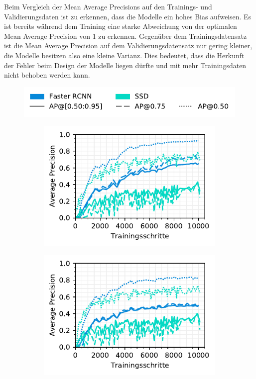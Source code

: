 Beim Vergleich der Mean Average Precisions auf den Trainings- und Validierungsdaten ist zu erkennen, dass die Modelle ein hohes Bias aufweisen. Es ist bereits während dem Training eine starke Abweichung von der optimalen Mean Average Precision von 1 zu erkennen. Gegenüber dem Trainingsdatensatz ist die Mean Average Precision auf dem Validierungsdatensatz nur gering kleiner, die Modelle besitzen also eine kleine Varianz. Dies bedeutet, dass die Herkunft der Fehler beim Design der Modelle liegen dürfte und mit mehr Trainingsdaten nicht behoben werden kann. 

\begin{figure}[H]
  \captionsetup{width=.9\linewidth}
  \caption{TODO}
  \label{fig:3ap-map}
  \centering
  \includegraphics[scale=1]{graphics/matplot/img-detection__legend_3.pdf}
  \begin{subfigure}[t]{0.5\linewidth}
    \centering
    \includegraphics[scale=1]{graphics/matplot/img-detection__all__ap__train.pdf}
    \label{fig:3ap-map:map_train}
    \vspace{2ex}
  \end{subfigure}%
  \begin{subfigure}[t]{0.5\linewidth}
    \centering
    \includegraphics[scale=1]{graphics/matplot/img-detection__all__ap.pdf}

\end{subfigure}
\end{figure}
